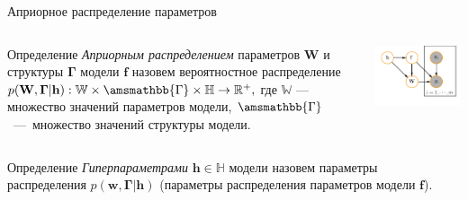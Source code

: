 \documentclass[usenames,dvipsnames,11pt,pdf,utf8,russian,aspectratio=43]{beamer}
\begin{document}
\begin{frame}{Априорное распределение параметров}
\footnotesize   
\begin{columns}
\begin{column}{0.6\textwidth}
   \begin{block}{Определение}
\textit{Априорным распределением} параметров $\mathbf{W}$ и структуры  $\boldsymbol{\Gamma}$ модели $\mathbf{f}$ назовем вероятностное распределение
$
    p(\mathbf{W}, \boldsymbol{\Gamma}|\mathbf{h}): \mathbb{W} \times \amsmathbb{\Gamma} \times \mathbb{H} \to \mathbb{R}^{+}, 
$
где $\mathbb{W}$ --- множество значений параметров модели, $\amsmathbb{\Gamma}$~---~множество значений структуры модели.
\end{block}

\end{column}
\begin{column}{0.4\textwidth}  %
    \begin{center}
     \includegraphics[width=\textwidth]{simple_plate.pdf}
     \end{center}
\end{column}
\end{columns}
\vspace*{-0.5cm}
\begin{block}{Определение}
\textit{Гиперпараметрами} $\mathbf{h}\in \mathbb{H}$ модели  назовем параметры распределения $p(\mathbf{w}, \boldsymbol{\Gamma}|\mathbf{h})$ (параметры распределения параметров модели $\mathbf{f}$).
  
\end{block}


\end{frame}
\end{document}
